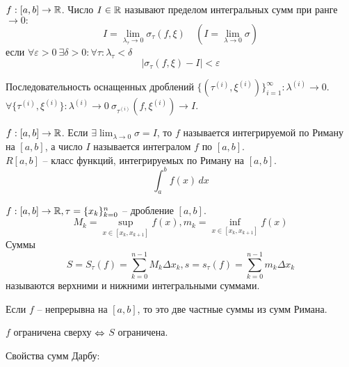 \begin{figure*}[h]
	\centering
	\def\svgwidth{0.5\columnwidth}
	
\end{figure*}

\begin{Def}
	$f : [a, b] \to \mathbb{R}$. Число $I \in \mathbb{R}$ называют пределом интегральных сумм при ранге $\to 0 :$
	\[I = \lim_{\lambda_\tau \to 0} \sigma_\tau (f, \xi) \quad (I = \lim_{\lambda \to 0} \sigma)\]
	если $\forall \varepsilon > 0 \ \exists \delta > 0 : \forall \tau : \lambda_\tau < \delta$
	\[|\sigma_\tau (f, \xi) - I| < \varepsilon\] 
\end{Def}

\begin{Rem}
	Последовательность оснащенных дроблений $\{(\tau^{(i)}, \xi^{(i)})\}_{i = 1}^\infty : \lambda^{(i)} \to 0$.
	$\forall \{\tau^{(i)}, \xi^{(i)}\} : \lambda^{(i)} \to 0 \ \sigma_{\tau^{(i)}}(f, \xi^{(i)}) \to I$.  
\end{Rem}

\begin{Def}
	$f : [a, b] \to \mathbb{R}$. Если $\exists \lim_{\lambda \to 0} \sigma = I $, то $f$ называется интегрируемой по Риману на $[a, b]$, а число $I$ называется интегралом $f$ по $[a, b]$. \\
	$R[a, b]$ -- класс функций, интегрируемых по Риману на $[a, b]$.
	\[\int_a^b f(x)\,dx\]
\end{Def}


\begin{Def}
	$f : [a, b] \to \mathbb{R}, \tau = \{x_k\}_{k = 0}^n$ -- дробление $[a, b]$.
	\[M_k = \displaystyle{\sup_{x \in [x_k, x_{k + 1}]}} f(x), m_k = \displaystyle{\inf_{x \in [x_k, x_{k + 1}]}}f(x)\] 
	Суммы
	\[S = S_\tau (f) = \displaystyle{\sum_{k = 0}^{n - 1}} M_k \Delta x_k, s = s_\tau (f) = \displaystyle{\sum_{k = 0}^{n - 1}} m_k \Delta x_k\]
	называются верхними и нижними интегральными суммами.
\end{Def}

\begin{Rem}
	Если $f$ -- непрерывна на $[a, b]$, то это две частные суммы из сумм Римана.
\end{Rem}

\begin{Rem}
	$f$ ограничена сверху $\Leftrightarrow$ $S$ ограничена.
\end{Rem}

Свойства сумм Дарбу:

